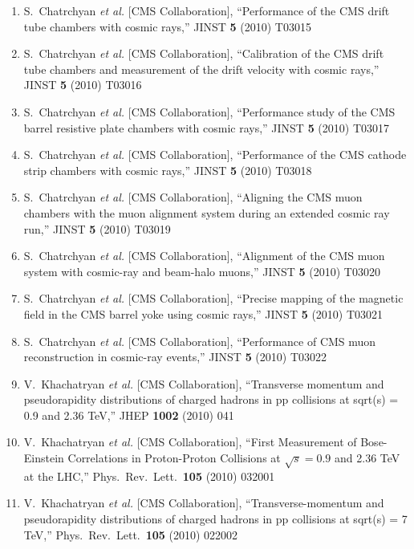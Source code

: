 \documentclass[10pt]{letter}
\begin{document}
\begin{enumerate}
\item S.~Chatrchyan {\it et al.}  [CMS Collaboration],
  ``Performance of the CMS drift tube chambers with cosmic rays,''
  JINST {\bf 5} (2010) T03015

\item S.~Chatrchyan {\it et al.}  [CMS Collaboration],
  ``Calibration of the CMS drift tube chambers and measurement of the drift velocity with cosmic rays,''
  JINST {\bf 5} (2010) T03016

\item S.~Chatrchyan {\it et al.}  [CMS Collaboration],
  ``Performance study of the CMS barrel resistive plate chambers with cosmic rays,''
  JINST {\bf 5} (2010) T03017

\item S.~Chatrchyan {\it et al.}  [CMS Collaboration],
  ``Performance of the CMS cathode strip chambers with cosmic rays,''
  JINST {\bf 5} (2010) T03018

\item S.~Chatrchyan {\it et al.}  [CMS Collaboration],
  ``Aligning the CMS muon chambers with the muon alignment system during an extended cosmic ray run,''
  JINST {\bf 5} (2010) T03019

\item S.~Chatrchyan {\it et al.}  [CMS Collaboration],
  ``Alignment of the CMS muon system with cosmic-ray and beam-halo muons,''
  JINST {\bf 5} (2010) T03020

\item S.~Chatrchyan {\it et al.}  [CMS Collaboration],
  ``Precise mapping of the magnetic field in the CMS barrel yoke using cosmic rays,''
  JINST {\bf 5} (2010) T03021

\item S.~Chatrchyan {\it et al.}  [CMS Collaboration],
  ``Performance of CMS muon reconstruction in cosmic-ray events,''
  JINST {\bf 5} (2010) T03022

\item V.~Khachatryan {\it et al.}  [CMS Collaboration],
  ``Transverse momentum and pseudorapidity distributions of charged hadrons in pp collisions at sqrt(s) = 0.9 and 2.36 TeV,''
  JHEP {\bf 1002} (2010) 041

\item V.~Khachatryan {\it et al.}  [CMS Collaboration],
  ``First Measurement of Bose-Einstein Correlations in Proton-Proton Collisions at $\sqrt{s}=0.9$ and 2.36 TeV at the LHC,''
  Phys.\ Rev.\ Lett.\  {\bf 105} (2010) 032001

\item V.~Khachatryan {\it et al.}  [CMS Collaboration], 
  ``Transverse-momentum and pseudorapidity distributions of charged hadrons in pp collisions at sqrt(s) = 7 TeV,''
  Phys.\ Rev.\ Lett.\  {\bf 105} (2010) 022002


\end{enumerate}
\end{document}
